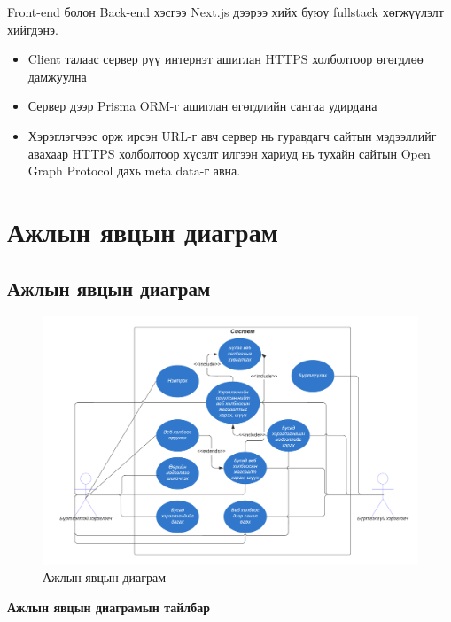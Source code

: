 Front-end болон Back-end хэсгээ Next.js дээрээ хийх буюу fullstack хөгжүүлэлт хийгдэнэ. 

\begin{itemize}
	\item Client талаас сервер рүү интернэт ашиглан HTTPS холболтоор өгөгдлөө дамжуулна
	\item Сервер дээр Prisma ORM-г ашиглан өгөгдлийн сангаа удирдана
	\item Хэрэглэгчээс орж ирсэн URL-г авч сервер нь гуравдагч сайтын мэдээллийг авахаар HTTPS холболтоор хүсэлт илгээн хариуд нь тухайн сайтын Open Graph Protocol дахь meta data-г авна.
\end{itemize}


\pagebreak
\section{Ажлын явцын диаграм}

\subsection{Ажлын явцын диаграм}
\begin{figure}[h]
	\centering
	\includegraphics[width=15cm]{images/usecase.png}
	\caption{Ажлын явцын диаграм}
	\label{fig:usecase}
\end{figure}

\textbf{Ажлын явцын диаграмын тайлбар}

